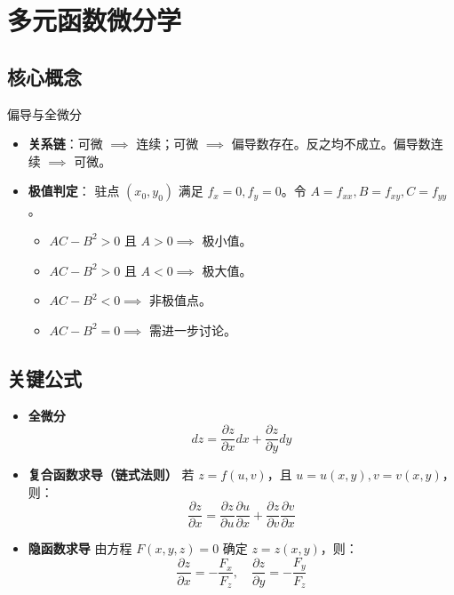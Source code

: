 \documentclass[UTF8, a4paper, 10pt]{ctexart} %
\newenvironment{formula}{
    \begin{tcolorbox}[
        colback=white, 
        colframe=blue!50!black, 
        title=关键公式, 
        fonttitle=\bfseries\small, 
        arc=1mm,
        left=2pt, right=2pt, top=2pt, bottom=2pt, %
        toptitle=1pt, bottomtitle=1pt
    ]
    \begin{itemize}[leftmargin=*, nosep, labelsep=3pt] 
}{
    \end{itemize}
    \end{tcolorbox}
}
\begin{document}
\section{多元函数微分学}

\subsection{核心概念}
\begin{concept}{偏导与全微分}
    \begin{itemize}[nosep]
        \item \textbf{关系链}：可微 $\implies$ 连续；可微 $\implies$ 偏导数存在。反之均不成立。偏导数连续 $\implies$ 可微。
        \item \textbf{极值判定}：
        驻点 $(x_0, y_0)$ 满足 $f_x=0, f_y=0$。令 $A=f_{xx}, B=f_{xy}, C=f_{yy}$。
        \begin{itemize}[nosep]
            \item $AC - B^2 > 0$ 且 $A > 0 \implies$ 极小值。
            \item $AC - B^2 > 0$ 且 $A < 0 \implies$ 极大值。
            \item $AC - B^2 < 0 \implies$ 非极值点。
            \item $AC - B^2 = 0 \implies$ 需进一步讨论。
        \end{itemize}
    \end{itemize}
\end{concept}

\subsection{关键公式}
\begin{formula}
    \item \textbf{全微分}
    $$ dz = \frac{\partial z}{\partial x} dx + \frac{\partial z}{\partial y} dy $$
    \item \textbf{复合函数求导（链式法则）}
    若 $z = f(u, v)$，且 $u=u(x,y), v=v(x,y)$，则：
    $$ \frac{\partial z}{\partial x} = \frac{\partial z}{\partial u}\frac{\partial u}{\partial x} + \frac{\partial z}{\partial v}\frac{\partial v}{\partial x} $$
    \item \textbf{隐函数求导}
    由方程 $F(x, y, z) = 0$ 确定 $z=z(x,y)$，则：
    $$ \frac{\partial z}{\partial x} = -\frac{F_x}{F_z}, \quad \frac{\partial z}{\partial y} = -\frac{F_y}{F_z} $$
\end{formula}
\end{document}
